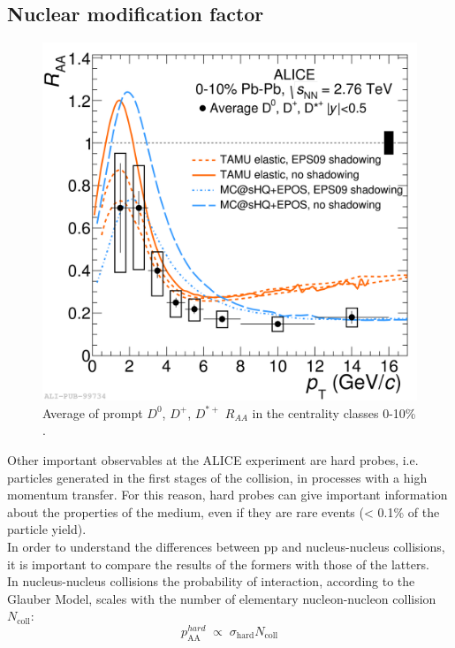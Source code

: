 \subsection{Nuclear modification factor}
%
\begin{figure}
  \centering
  \includegraphics[scale=0.15]{figures/Raa.png}
  \caption{Average of prompt $D^0$, $D^+$, $D^{*+}$ $R_{AA}$ in the centrality classes 0-10\% \cite{RAAFIG}.}
  \label{fig:Raa}
\end{figure}
%
Other important observables at the ALICE experiment are hard probes, i.e. particles generated in the first stages of the collision, in processes with a high momentum transfer. For this reason, hard probes can give important information about the properties of the medium, even if they are rare events (< 0.1\% of the particle yield).\\
In order to understand the differences between pp and nucleus-nucleus collisions, it is important to compare the results of the formers with those of the latters.\\
In nucleus-nucleus collisions the probability of interaction, according to the Glauber Model, scales with the number of elementary nucleon-nucleon collision $N_{\mathrm{coll}}$:
\begin{equation}
 p_{\mathrm{AA}}^{hard}\;\propto\;\sigma_{\mathrm{hard}}N_{\mathrm{coll}}
\end{equation}
